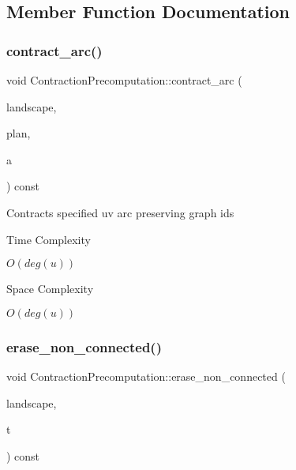 \subsection{Member Function Documentation}
\mbox{\label{class_contraction_precomputation_a6cbc9c5ee6d4ec9a5092d6e624922396}} 
\subsubsection{\texorpdfstring{contract\+\_\+arc()}{contract\_arc()}}
{\footnotesize\ttfamily void Contraction\+Precomputation\+::contract\+\_\+arc (\begin{DoxyParamCaption}\item[{\hyperlink{class_landscape}{Landscape} \&}]{landscape,  }\item[{\hyperlink{class_restoration_plan}{Restoration\+Plan} \&}]{plan,  }\item[{Graph\+\_\+t\+::\+Arc}]{a }\end{DoxyParamCaption}) const}

Contracts specified uv arc preserving graph ids

\begin{DoxyRefDesc}{Time Complexity}
\item[\hyperlink{time__time000002}{Time Complexity}]$O(deg(u))$ \end{DoxyRefDesc}
\begin{DoxyRefDesc}{Space Complexity}
\item[\hyperlink{space__space000002}{Space Complexity}]$O(deg(u))$ \end{DoxyRefDesc}
\mbox{\label{class_contraction_precomputation_ab4ae0b053d4cb51b2d2c4d07027ee2b7}} 
\subsubsection{\texorpdfstring{erase\+\_\+non\+\_\+connected()}{erase\_non\_connected()}}
{\footnotesize\ttfamily void Contraction\+Precomputation\+::erase\+\_\+non\+\_\+connected (\begin{DoxyParamCaption}\item[{\hyperlink{class_landscape}{Landscape} \&}]{landscape,  }\item[{Graph\+\_\+t\+::\+Node}]{t }\end{DoxyParamCaption}) const}

